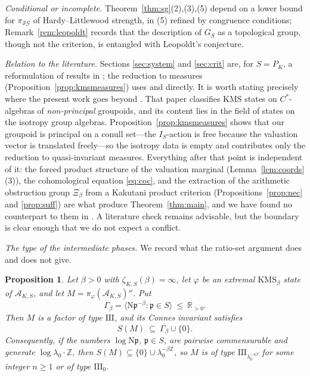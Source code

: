 \documentclass[11pt]{amsart}
\numberwithin{equation}{section}
\newtheorem{proposition}[theorem]{Proposition}
\theoremstyle{definition}
\theoremstyle{remark}
\newcommand{\Z}{\mathbb{Z}}
\newcommand{\R}{\mathbb{R}}
\newcommand{\Ns}{\mathrm{N}}
\newcommand{\cA}{\mathcal{A}}
\newcommand{\pp}{\mathfrak{p}}
\newcommand{\SG}{\mathcal{SG}}
\begin{document}
\emph{Conditional or incomplete.} Theorem~\ref{thm:sg}(2),(3),(5) depend on a
lower bound for $\pi_\SG$ of Hardy--Littlewood strength, in (5) refined by
congruence conditions; Remark~\ref{rem:leopoldt} records that the description of $G_S$ as a
topological group, though not the criterion, is entangled with Leopoldt's
conjecture.

\emph{Relation to the literature.} Sections \ref{sec:system} and \ref{sec:crit} are, for
$S=P_K$, a reformulation of results in \cite{BC,LR,LLN,Nesh13,Nesh02}; the reduction to
measures (Proposition~\ref{prop:kmsmeasures}) uses \cite{Laca} and \cite{Nesh13} directly.
It is worth stating precisely where the present work goes beyond \cite{Nesh13}. That paper
classifies KMS states on $C^*$-algebras of \emph{non-principal} groupoids, and its content
lies in the field of states on the isotropy group algebras. Proposition~\ref{prop:kmsmeasures}
shows that our groupoid is principal on a conull set---the $I_S$-action is free because the
valuation vector is translated freely---so the isotropy data is empty and \cite{Nesh13}
contributes only the reduction to quasi-invariant measures. Everything after that point is
independent of it: the forced product structure of the valuation marginal
(Lemma~\ref{lem:coords}(3)), the cohomological equation \eqref{eq:coc}, and the extraction
of the arithmetic obstruction group $\Xi_\beta$ from a Kakutani product criterion
(Propositions~\ref{prop:nec} and \ref{prop:suff}) are what produce Theorem~\ref{thm:main},
and we have found no counterpart to them in \cite{Nesh13}. A literature check remains
advisable, but the boundary is clear enough that we do not expect a conflict.

\emph{The type of the intermediate phases.} We record what the ratio-set argument does and
does not give.

\begin{proposition}\label{prop:type}
Let $\beta>0$ with $\zeta_{K,S}(\beta)=\infty$, let $\varphi$ be an extremal
$\mathrm{KMS}_\beta$ state of $\cA_{K,S}$, and let $M=\pi_\varphi(\cA_{K,S})''$. Put
\[
\Gamma_\beta=\bigl\langle \Ns\pp^{-\beta}:\pp\in S\bigr\rangle\ \le\ \R_{>0}.
\]
Then $M$ is a factor of type $\mathrm{III}$, and its Connes invariant satisfies
\[
S(M)\ \subseteq\ \overline{\Gamma_\beta}\cup\{0\}.
\]
Consequently, if the numbers $\log\Ns\pp$, $\pp\in S$, are pairwise commensurable and
generate $\log\lambda_0\cdot\Z$, then $S(M)\subseteq\{0\}\cup\lambda_0^{-\beta\Z}$, so $M$ is of type
$\mathrm{III}_{\lambda_0^{-n\beta}}$ for some integer $n\ge1$ or of type $\mathrm{III}_0$.
\end{proposition}
\end{document}
